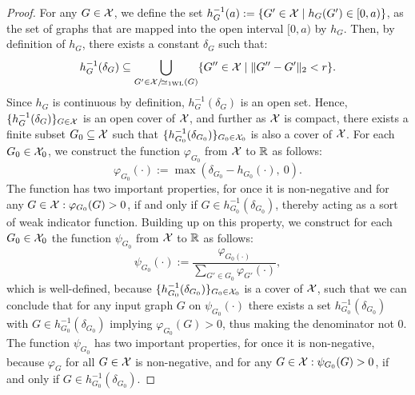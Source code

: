 \begin{proof}
    For any $G \in \mathcal{X}$, we define the set $h_{G}^{-1}(a) := \{ G' \in \mathcal{X} \mid h_G(G') \in [0, a) \}$, as the set of graphs that are mapped into the open interval $[0, a)$ by $h_G$. Then, by definition of $h_G$, there exists a constant $\delta_G$ such that:
    \begin{equation*}
        h_{G}^{-1}(\delta_G) \subseteq \bigcup_{G'\in \mathcal{X}/\!{\simeq_{\text{1WL}}}(G)} \{ G'' \in \mathcal{X} \mid \| G'' - G' \|_2 < r \}.
    \end{equation*}
    Since $h_G$ is continuous by definition, $h_{G}^{-1}(\delta_G)$ is an open set. Hence, $\{ h_{G}^{-1}(\delta_G) \}_{G \in \mathcal{X}}$ is an open cover of $\mathcal{X}$, and further as $\mathcal{X}$ is compact, there exists a finite subset $G_0 \subseteq \mathcal{X}$ such that $\{ h_{G_0}^{-1}(\delta_{G_0}) \}_{G_0 \in \mathcal{X}_0}$ is also a cover of $\mathcal{X}$. For each $G_0 \in \mathcal{X}_0$, we construct the function $\varphi_{G_0}$ from $\mathcal{X}$ to $\mathbb{R}$ as follows:
    \begin{equation*}
        \varphi_{G_0} (\cdot) := \max(\delta_{G_0} -  h_{G_0}(\cdot), \ 0).
    \end{equation*}
    The function has two important properties, for once it is non-negative and for any $G \in \mathcal{X}: \varphi_{G_0}(G) > 0$, if and only if $G \in h_{G_0}^{-1}(\delta_{G_0})$, thereby acting as a sort of weak indicator function. Building up on this property, we construct for each $G_0 \in \mathcal{X}_0$ the function $\psi_{G_0}$ from $\mathcal{X}$ to $\mathbb{R}$ as follows:
    \begin{equation*}
        \psi_{G_0}(\cdot) := \frac{\varphi_{G_0(\cdot)}}{\sum_{G' \in G_0} \varphi_{G'}(\cdot)},
    \end{equation*}
    which is well-defined, because $\{ h_{G_0}^{-1}(\delta_{G_0}) \}_{G_0 \in \mathcal{X}_0}$ is a cover of $\mathcal{X}$, such that we can conclude that for any input graph $G$ on $\psi_{G_0}(\cdot)$ there exists a set $h_{G_0}^{-1}(\delta_{G_0})$ with $G \in h_{G_0}^{-1}(\delta_{G_0})$ implying $\varphi_{G_0}(G) > 0$, thus making the denominator not $0$. The function $\psi_{G_0}$ has two important properties, for once it is non-negative, because $\varphi_{G}$ for all $G \in \mathcal{X}$ is non-negative, and for any $G \in \mathcal{X}: \psi_{G_0}(G) > 0$, if and only if $G \in h_{G_0}^{-1}(\delta_{G_0})$.


\end{proof}
